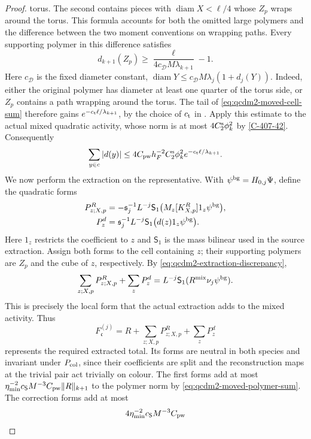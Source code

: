 \documentclass[11pt,letterpaper,reqno]{amsart}
\theoremstyle{definition}
\theoremstyle{remark}
\begin{document}
\begin{proof}
torus.  The second contains pieces with
$\operatorname{diam}X<\ell/4$ whose $Z_p$ wraps around
the torus.  This formula accounts for both the omitted
large polymers and the difference between the two
moment conventions on wrapping paths.
Every supporting polymer in this difference satisfies
\[
 d_{k+1}(Z_p)\ge
 \frac{\ell}{4c_{\mathcal D}M\lambda_{k+1}}-1.
\]
Here $c_{\mathcal D}$ is the fixed diameter constant,
$\operatorname{diam}Y\le c_{\mathcal D}M\lambda_j(1+d_j(Y))$.
Indeed, either the original polymer has diameter at least
one quarter of the torus side, or $Z_p$ contains a path
wrapping around the torus. The tail of
\eqref{eq:qcdm2-moved-cell-sum} therefore gains
$e^{-c_{\rm t}\ell/\lambda_{k+1}}$, by the choice of
$c_{\rm t}$ in \cite[Prop. 10.1]{QCDM1}.
Apply this estimate to the actual mixed quadratic activity,
whose norm is at most $4C_2^{\rm s}\phi_k^2$ by
\cref{C-407-42}.
Consequently
\begin{equation}\label{eq:qcdm2-seam-discrepancy}
 \sum_{y\in c}|d(y)|
 \le4C_{\rm pw}h_F^{-2}C_2^{\rm s}\phi_k^2
                       e^{-c_{\rm t}\ell/\lambda_{k+1}}.
\end{equation}
We now perform the extraction on the representative.
With $\psi^{\rm bg}=H_{0,j}\Psi$, define the quadratic
forms
\begin{align*}
 P^R_{z;X,p}
  &=-\mathfrak s_j^{-1}L^{-j}
          \mathsf S_1\bigl(M_z[K^R_{X,p}]1_z\psi^{\rm bg}\bigr),\\
 P^d_z
  &=\mathfrak s_j^{-1}L^{-j}
          \mathsf S_1\bigl(d(z)1_z\psi^{\rm bg}\bigr).
\end{align*}
Here $1_z$ restricts the coefficient to $z$ and
$\mathsf S_1$ is the mass bilinear used in the source
extraction.  Assign both forms to the cell containing
$z$; their supporting polymers are $Z_p$ and the cube
of $z$, respectively.  By
\eqref{eq:qcdm2-extraction-discrepancy},
\[
 \sum_{z;X,p}P^R_{z;X,p}+\sum_zP^d_z
       =L^{-j}\mathsf S_1(R^{\rm mix}\nu_j\psi^{\rm bg}).
\]
This is precisely the local form that the actual
extraction adds to the mixed activity.  Thus
\[
 F_{\mathfrak c}^{(j)}
       =R+\sum_{z;X,p}P^R_{z;X,p}+\sum_zP^d_z
\]
represents the required extracted total.  Its forms
are neutral in both species and invariant under
$P_{\rm col}$, since their coefficients are split and
the reconstruction maps at the trivial pair act
trivially on colour.
The first forms add at most
$\eta_{\min}^{-2}c_{\mathsf S}M^{-3}C_{\rm pw}\|R\|_{k+1}$
to the polymer norm by
\eqref{eq:qcdm2-moved-polymer-sum}.
The correction forms add at most
\[
 4\eta_{\min}^{-2}c_{\mathsf S}M^{-3}C_{\rm pw}
\]
\end{proof}
\end{document}

